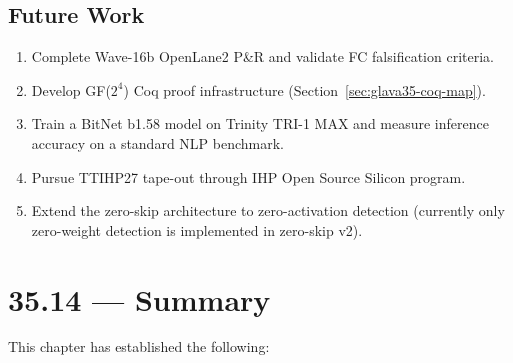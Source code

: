 \subsection{Future Work}

\begin{enumerate}
  \item Complete Wave-16b OpenLane2 P\&R and validate FC falsification criteria.
  \item Develop GF(\(2^4\)) Coq proof infrastructure (Section~\ref{sec:glava35-coq-map}).
  \item Train a BitNet b1.58 model on Trinity TRI-1 MAX and measure inference
        accuracy on a standard NLP benchmark.
  \item Pursue TTIHP27 tape-out through IHP Open Source Silicon program.
  \item Extend the zero-skip architecture to zero-activation detection
        (currently only zero-weight detection is implemented in zero-skip v2).
\end{enumerate}

\section{35.14 --- Summary}
\label{sec:glava35-summary}

This chapter has established the following:

